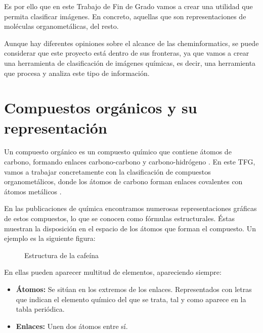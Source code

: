 Es por ello que en este Trabajo de Fin de Grado vamos a crear una utilidad que permita clasificar imágenes. En concreto, aquellas que son representaciones de moléculas organometálicas, del resto.

Aunque hay diferentes opiniones sobre el alcance de las cheminformatics, se puede considerar que este proyecto está dentro de sus fronteras, ya que vamos a crear una herramienta de clasificación de imágenes químicas, es decir, una herramienta que procesa y analiza este tipo de información.

\section*{Compuestos orgánicos y su representación}
Un compuesto orgánico es un compuesto químico que contiene átomos de carbono, formando enlaces carbono-carbono y carbono-hidrógeno \cite{comporganico}. En este TFG, vamos a trabajar concretamente con la clasificación de compuestos organometálicos, donde los átomos de carbono forman enlaces covalentes con átomos metálicos \cite{comporganometalico}.

En las publicaciones de química encontramos numerosas representaciones gráficas de estos compuestos, lo que se conocen como fórmulas estructurales. Éstas muestran la disposición en el espacio de los átomos que forman el compuesto. Un ejemplo es la siguiente figura:

\begin{figure}[H]
\centering
    \caption{Estructura de la cafeína} \label{fig:figura1}
\end{figure}

\noindent En ellas pueden aparecer multitud de elementos, apareciendo siempre:
\begin{itemize}
    \item \textbf{Átomos:} Se sitúan en los extremos de los enlaces. Representados con letras que indican el elemento químico del que se trata, tal y como aparece en la tabla periódica.
    \item \textbf{Enlaces:} Unen dos átomos entre sí. 
\end{itemize}

